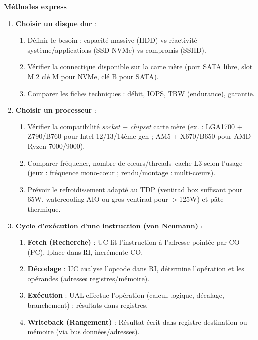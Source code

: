 \documentclass[11pt]{article}
\begin{document}
\begin{aretenir}
\textbf{Méthodes express}
\begin{enumerate}
  \item \textbf{Choisir un disque dur} : 
  \begin{enumerate}
    \item Définir le besoin : capacité massive (HDD) vs réactivité système/applications (SSD NVMe) vs compromis (SSHD).
    \item Vérifier la connectique disponible sur la carte mère (port SATA libre, slot M.2 clé M pour NVMe, clé B pour SATA).
    \item Comparer les fiches techniques : débit, IOPS, TBW (endurance), garantie.
  \end{enumerate}
  \item \textbf{Choisir un processeur} : 
  \begin{enumerate}
    \item Vérifier la compatibilité \emph{socket} + \emph{chipset} carte mère (ex. : LGA1700 + Z790/B760 pour Intel 12/13/14ème gen ; AM5 + X670/B650 pour AMD Ryzen 7000/9000).
    \item Comparer fréquence, nombre de cœurs/threads, cache L3 selon l'usage (jeux : fréquence mono-cœur ; rendu/montage : multi-cœurs).
    \item Prévoir le refroidissement adapté au TDP (ventirad box suffisant pour 65W, watercooling AIO ou gros ventirad pour $>$125W) et pâte thermique.
  \end{enumerate}
  \item \textbf{Cycle d'exécution d'une instruction (von Neumann)} : 
  \begin{enumerate}
    \item \textbf{Fetch (Recherche)} : UC lit l'instruction à l'adresse pointée par CO (PC), lplace dans RI, incrémente CO.
    \item \textbf{Décodage} : UC analyse l'opcode dans RI, détermine l'opération et les opérandes (adresses registres/mémoire).
    \item \textbf{Exécution} : UAL effectue l'opération (calcul, logique, décalage, branchement) ; résultats dans registres.
    \item \textbf{Writeback (Rangement)} : Résultat écrit dans registre destination ou mémoire (via bus données/adresses).
  \end{enumerate}
\end{enumerate}
\end{aretenir}
\end{document}
